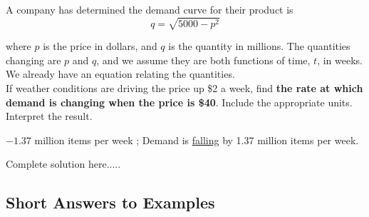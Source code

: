 \newpage
\begin{example}
A company has determined the demand curve for their product is
\begin{equation*}
q=\sqrt{5000-p^2}
\end{equation*}

\noindent where $p$ is the price in dollars, and $q$ is the quantity in millions. The quantities changing are $p$ and $q$, and we assume they are both functions of time, $t$, in weeks. We already have an equation relating the quantities.\\

\noindent If weather conditions are driving the price up \$2 a week, find \textbf{the rate at which demand is changing when the price is \$40}. Include the appropriate units. Interpret the result.
    \begin{sol}
    $-1.37$ million items per week ; Demand is \underline{falling} by 1.37 million items per week.
    \end{sol}
    \begin{solL}
    Complete solution here.....
    
    \end{solL}
    
\end{example}

\vspace*{\fill}

\subsection*{Short Answers to Examples}



